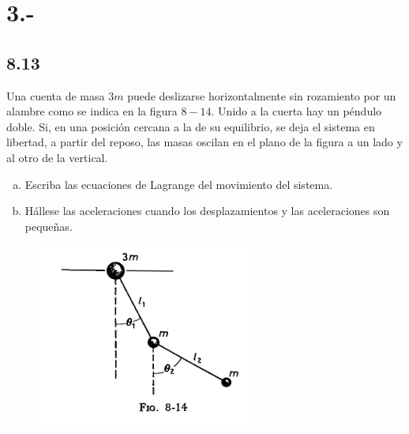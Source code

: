 \documentclass{article}
\begin{document}
\section*{3.-}
\subsection*{8.13}
Una cuenta de masa $3m$ puede deslizarse horizontalmente sin rozamiento por un alambre 
como se indica en la figura $8-14$. Unido a la cuerta hay un péndulo doble. Si, en una 
posición cercana a la de su equilibrio, se deja el sistema en libertad, a partir del
reposo, las masas oscilan en el plano de la figura a un lado y al otro de la vertical.
\begin{enumerate}[a)]
    \item Escriba las ecuaciones de Lagrange del movimiento del sistema.
    \item Hállese las aceleraciones cuando los desplazamientos y las aceleraciones son pequeñas.
\end{enumerate}
\begin{figure}[H]
    \centering
    \includegraphics[scale=0.8]{p3_pendulum.png}
\end{figure}
\end{document}
